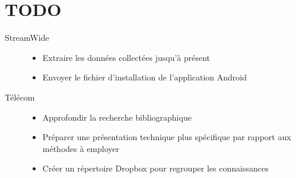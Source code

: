\documentclass[a4paper]{article}
\begin{document}
\section*{TODO}
\label{sec:todo}
\begin{description}
    \item[StreamWide]\hfill
        \begin{itemize}
            \item Extraire les donn\'ees collect\'ees jusqu'à pr\'esent
            \item Envoyer le fichier d'installation de l'application Android
        \end{itemize}
    \item[T\'el\'ecom]\hfill
        \begin{itemize}
            \item Approfondir la recherche bibliographique
            \item Pr\'eparer une pr\'esentation technique plus sp\'ecifique par
                rapport aux m\'ethodes à employer
            \item Cr\'eer un r\'epertoire Dropbox pour regrouper les
                connaissances
        \end{itemize}
\end{description}
\end{document}
